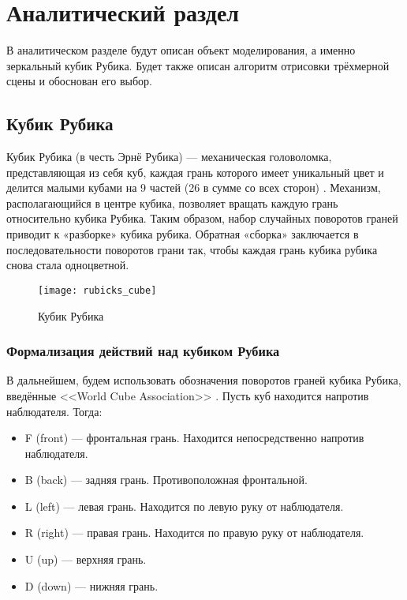 \section{Аналитический раздел}
В аналитическом разделе будут описан объект моделирования, а именно зеркальный кубик Рубика. Будет также описан алгоритм отрисовки трёхмерной сцены и обоснован его выбор.

\subsection{Кубик Рубика}
Кубик Рубика (в честь Эрнё Рубика) --- механическая головоломка, представляющая из себя куб,
каждая грань которого имеет уникальный цвет и делится малыми кубами на 9 частей (26 в сумме со всех сторон) \cite{bib:how_to_assemble}.
Механизм, располагающийся в центре кубика, позволяет вращать каждую грань относительно кубика Рубика.
Таким образом, набор случайных поворотов граней приводит к «разборке» кубика рубика.
Обратная «сборка» заключается в последовательности поворотов грани так,
чтобы каждая грань кубика рубика снова стала одноцветной.

\begin{figure}[ht]
	\centering
	\texttt{[image: rubicks\_cube]}
	\caption{Кубик Рубика}
	\label{fig:rubicks_cube}
\end{figure}

\subsubsection{Формализация действий над кубиком Рубика}
В дальнейшем, будем использовать обозначения поворотов граней кубика Рубика, введённые <<World Cube Association>> \cite{bib:cube_notation}. Пусть куб находится напротив наблюдателя. Тогда:

\begin{itemize}
	\item F (front) --- фронтальная грань. Находится непосредственно напротив наблюдателя.
	\item B (back) --- задняя грань. Противоположная фронтальной.
	\item L (left) --- левая грань. Находится по левую руку от наблюдателя.
	\item R (right) --- правая грань. Находится по правую руку от наблюдателя.
	\item U (up) --- верхняя грань.
	\item D (down) --- нижняя грань.
\end{itemize}

